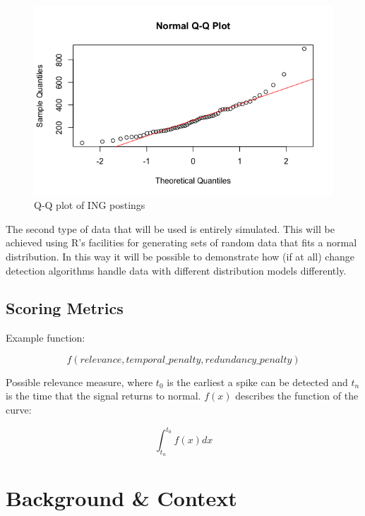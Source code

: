 \documentclass{uvamscse}	%
\begin{document}
\begin{figure}[t]
	\includegraphics[scale=0.5]{figures/qqplot-ing.png}
	\centering
	\caption{Q-Q plot of ING postings}
	\label{fig:ing_QQ_plot}
\end{figure}

The second type of data that will be used is entirely simulated. This will be achieved using R's facilities for generating sets of random data that fits a normal distribution. In this way it will be possible to demonstrate how (if at all) change detection algorithms handle data with different distribution models differently.

\section{Scoring Metrics}

Example function:

\begin{equation}
	f(relevance, temporal\_penalty, redundancy\_penalty)
\end{equation}


Possible relevance measure, where $t_0$ is the earliest a spike can be detected and $t_n$ is the time that the signal returns to normal. $f(x)$ describes the function of the curve:

\begin{equation}
	\int^{t_0}_{t_n} f(x) dx
\end{equation}

\chapter{Background \& Context}
\end{document}
